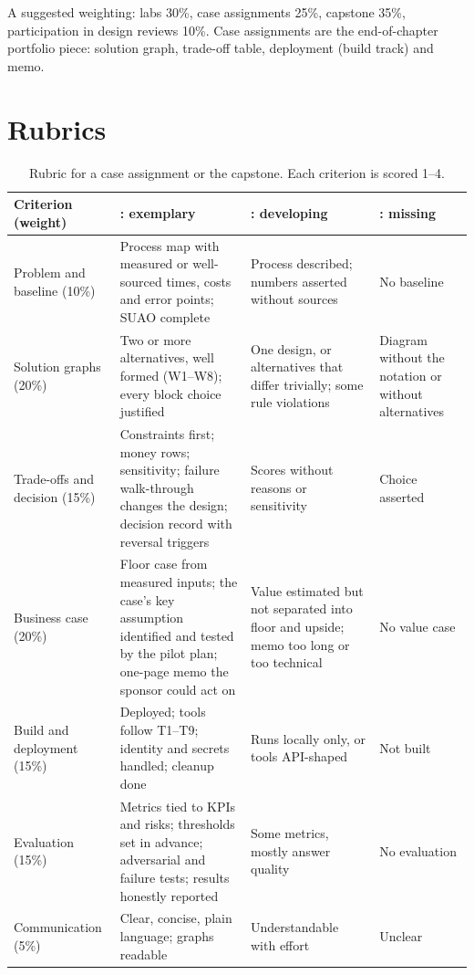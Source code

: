 A suggested weighting: labs 30\%, case assignments 25\%, capstone 35\%, participation in design reviews 10\%. Case assignments are the end-of-chapter portfolio piece: solution graph, trade-off table, deployment (build track) and memo.

\section{Rubrics}

\begin{table}[htbp]
\centering
\scriptsize
\setlength{\tabcolsep}{4pt}
\caption{Rubric for a case assignment or the capstone. Each criterion is scored 1--4.}
\label{tab:rubric}
\begin{tabularx}{\textwidth}{@{}>{\raggedright\arraybackslash}p{2.2cm}>{\raggedright\arraybackslash}X>{\raggedright\arraybackslash}X>{\raggedright\arraybackslash}X@{}}
\toprule
Criterion (weight) & 4: exemplary & 2: developing & 1: missing \\
\midrule
Problem and baseline (10\%) & Process map with measured or well-sourced times, costs and error points; SUAO complete & Process described; numbers asserted without sources & No baseline \\
Solution graphs (20\%) & Two or more alternatives, well formed (W1--W8); every block choice justified & One design, or alternatives that differ trivially; some rule violations & Diagram without the notation or without alternatives \\
Trade-offs and decision (15\%) & Constraints first; money rows; sensitivity; failure walk-through changes the design; decision record with reversal triggers & Scores without reasons or sensitivity & Choice asserted \\
Business case (20\%) & Floor case from measured inputs; the case's key assumption identified and tested by the pilot plan; one-page memo the sponsor could act on & Value estimated but not separated into floor and upside; memo too long or too technical & No value case \\
Build and deployment (15\%) & Deployed; tools follow T1--T9; identity and secrets handled; cleanup done & Runs locally only, or tools API-shaped & Not built \\
Evaluation (15\%) & Metrics tied to KPIs and risks; thresholds set in advance; adversarial and failure tests; results honestly reported & Some metrics, mostly answer quality & No evaluation \\
Communication (5\%) & Clear, concise, plain language; graphs readable & Understandable with effort & Unclear \\
\bottomrule
\end{tabularx}
\end{table}

